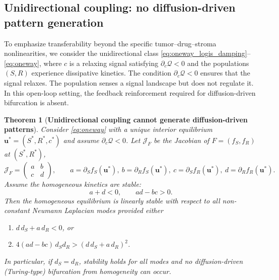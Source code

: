 \documentclass[pdflatex,sn-mathphys-ay]{sn-jnl}
\theoremstyle{thmstyleone}
\newtheorem{theorem}{Theorem}[section]
\theoremstyle{definition}
\theoremstyle{remark}
\begin{document}
\subsection{Unidirectional coupling: no diffusion-driven pattern generation}
\label{subsec:oneway}

To emphasize transferability beyond the specific tumor--drug--stroma nonlinearities, we consider the unidirectional class \eqref{eq:oneway_logis_damping}--\eqref{eq:oneway}, where $c$ is a relaxing signal satisfying $\partial_c\mathcal Q<0$ and the populations $(S,R)$ experience dissipative kinetics. 
The condition $\partial_c\mathcal Q<0$ ensures that the signal relaxes.
The population senses a signal landscape but does not regulate it. 
In this open-loop setting, the feedback reinforcement required for diffusion-driven bifurcation is absent. 


\begin{theorem}[\textbf{Unidirectional coupling cannot generate diffusion-driven patterns}]
\label{thm:oneway}
Consider \eqref{eq:oneway} with a unique interior equilibrium $\mathbf{u}^*=(S^*,R^*,c^*)$ and assume $\partial_c\mathcal{Q}<0$.
Let $\mathcal{J}_F$ be the Jacobian of $F=(f_S,f_R)$ at $(S^*,R^*)$,
\[
\mathcal{J}_F=
\begin{pmatrix}
a & b\\
c & d
\end{pmatrix},
\qquad
a=\partial_S f_S(\mathbf{u}^*),\ 
b=\partial_R f_S(\mathbf{u}^*),\ 
c=\partial_S f_R(\mathbf{u}^*),\ 
d=\partial_R f_R(\mathbf{u}^*).
\]
Assume the homogeneous kinetics are stable:
\[
a+d<0,
\qquad 
ad-bc>0.
\]
Then the homogeneous equilibrium is linearly stable with respect to all non-constant Neumann Laplacian modes provided either
\begin{enumerate}[label=(\roman*)]
\item $d\,d_S+a\,d_R<0$, \quad or
\item $4(ad-bc)\,d_Sd_R>(d\,d_S+a\,d_R)^2$.
\end{enumerate}
In particular, if $d_S=d_R$, stability holds for all modes and no diffusion-driven (Turing-type) bifurcation from homogeneity can occur.
\end{theorem}
\end{document}

